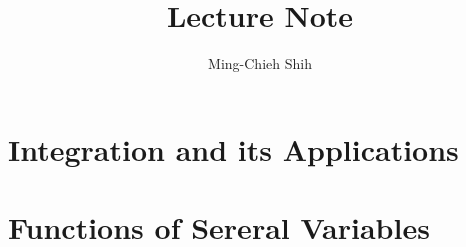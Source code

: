 \documentclass{easyclass}
\begin{document}
\begin{titlepage}
    \title{Lecture Note}
    \author{Ming-Chieh Shih}
    \maketitle
\end{titlepage}

\tableofcontents

% 

% 

% 

% 

% 

% 

\chapter{Integration and its Applications}


\chapter{Functions of Sereral Variables}


%
\end{document}
